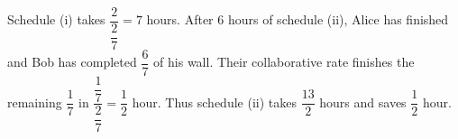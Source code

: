 Schedule (i) takes $\dfrac{2}{\dfrac{2}{7}}=7$ hours. After 6 hours of schedule (ii), Alice has finished and Bob has completed $\dfrac{6}{7}$ of his wall. Their collaborative rate finishes the remaining $\dfrac{1}{7}$ in $\dfrac{\dfrac{1}{7}}{\dfrac{2}{7}}=\dfrac{1}{2}$ hour. Thus schedule (ii) takes $\dfrac{13}{2}$ hours and saves $\boxed{\dfrac{1}{2}\text{ hour}}$.
